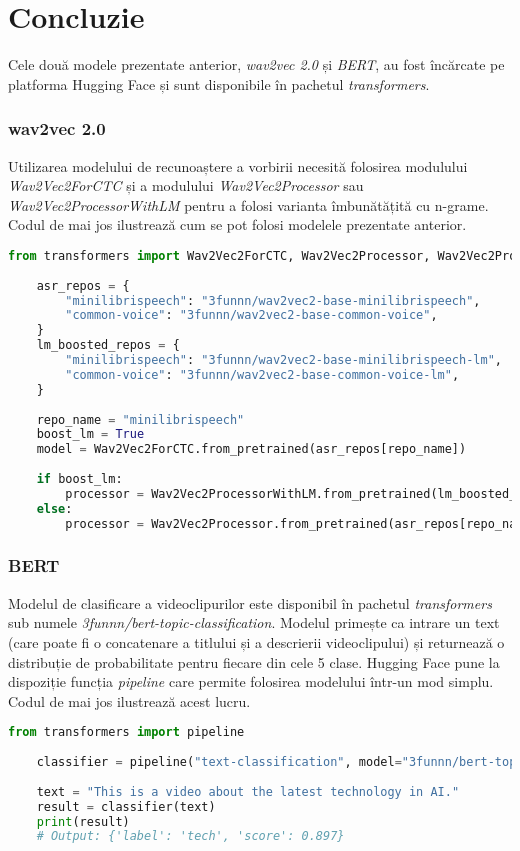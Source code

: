 \section{Concluzie}
Cele două modele prezentate anterior, \textit{wav2vec 2.0} și \textit{BERT}, au fost încărcate
pe platforma Hugging Face și sunt disponibile în pachetul \textit{transformers}.

\subsubsection{wav2vec 2.0}
Utilizarea modelului de recunoaștere a vorbirii necesită folosirea modulului \textit{Wav2Vec2ForCTC}
și a modulului \textit{Wav2Vec2Processor} sau \textit{Wav2Vec2ProcessorWithLM} pentru a folosi varianta
îmbunătățită cu n-grame. Codul de mai jos ilustrează cum se pot folosi modelele prezentate anterior.

\begin{lstlisting}[language=Python]
    from transformers import Wav2Vec2ForCTC, Wav2Vec2Processor, Wav2Vec2ProcessorWithLM
    
    asr_repos = {
        "minilibrispeech": "3funnn/wav2vec2-base-minilibrispeech",
        "common-voice": "3funnn/wav2vec2-base-common-voice",
    }
    lm_boosted_repos = {
        "minilibrispeech": "3funnn/wav2vec2-base-minilibrispeech-lm",
        "common-voice": "3funnn/wav2vec2-base-common-voice-lm",
    }
    
    repo_name = "minilibrispeech"
    boost_lm = True
    model = Wav2Vec2ForCTC.from_pretrained(asr_repos[repo_name])
    
    if boost_lm:
        processor = Wav2Vec2ProcessorWithLM.from_pretrained(lm_boosted_repos[repo_name])
    else:
        processor = Wav2Vec2Processor.from_pretrained(asr_repos[repo_name])
    \end{lstlisting}


\subsubsection{BERT}
Modelul de clasificare a videoclipurilor este disponibil în pachetul \textit{transformers} sub numele
\textit{3funnn/bert-topic-classification}. Modelul primește ca intrare un text (care poate fi o 
concatenare a titlului și a descrierii videoclipului) și returnează o distribuție de probabilitate
pentru fiecare din cele 5 clase. Hugging Face pune la dispoziție funcția \textit{pipeline} care
permite folosirea modelului într-un mod simplu. Codul de mai jos ilustrează acest lucru.

\begin{lstlisting}[language=Python]
    from transformers import pipeline
    
    classifier = pipeline("text-classification", model="3funnn/bert-topic-classification")
    
    text = "This is a video about the latest technology in AI."
    result = classifier(text)
    print(result)
    # Output: {'label': 'tech', 'score': 0.897}
\end{lstlisting}

